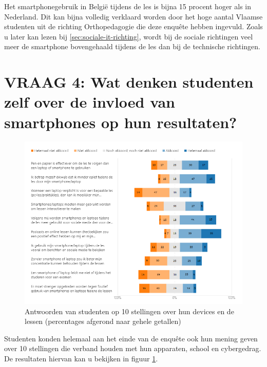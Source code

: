 Het smartphonegebruik in België tijdens de les is bijna 15 procent hoger als in Nederland. Dit kan bijna volledig verklaard worden door het hoge aantal Vlaamse studenten uit de richting Orthopedagogie die deze enquête hebben ingevuld. Zoals u later kan lezen bij \ref{sec:sociale-it-richting}, wordt bij de sociale richtingen veel meer de smartphone bovengehaald tijdens de les dan bij de technische richtingen. 

\section{VRAAG 4: Wat denken studenten zelf over de invloed van smartphones op hun resultaten?}
\label{sec:invloed-resultaten}

\begin{figure}
	\includegraphics[width=\textwidth]
	{img/stellingen.png}
	\caption{Antwoorden van studenten op 10 stellingen over hun devices en de lessen (percentages afgerond naar gehele getallen)}
	\label{fig:stellingen}
\end{figure}

Studenten konden helemaal aan het einde van de enquête ook hun mening geven over 10 stellingen die verband houden met hun apparaten, school en cybergedrag. De resultaten hiervan kan u bekijken in figuur \ref{fig:stellingen}. 

